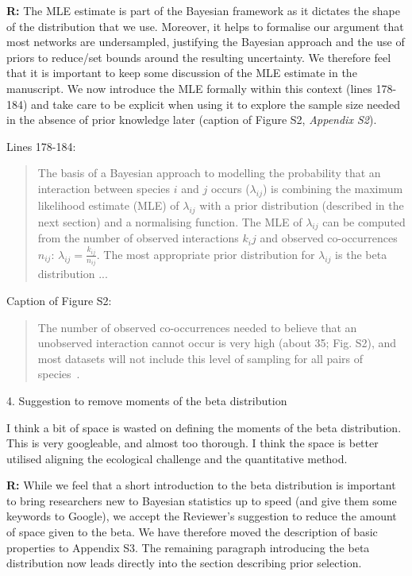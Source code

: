 \documentclass[12pt]{letter}
\newenvironment{refquote}{\bigskip \begin{it}}{\end{it}\smallskip}
\begin{document}
		\textbf{R:} The MLE estimate is part of the Bayesian framework as it dictates the shape of the distribution that we use. Moreover, it helps to formalise our argument that most networks are undersampled, justifying the Bayesian approach and the use of priors to reduce/set bounds around the resulting uncertainty. We therefore feel that it is important to keep some discussion of the MLE estimate in the manuscript. We now introduce the MLE formally within this context (lines 178-184) and take care to be explicit when using it to explore the sample size needed in the absence of prior knowledge later (caption of Figure S2, \emph{Appendix S2}).


		Lines 178-184:


		\begin{quotation}
			The basis of a Bayesian approach to modelling the probability that an interaction between species $i$ and $j$ occurs ($\lambda_{ij}$) is combining the maximum likelihood estimate (MLE) of $\lambda_{ij}$ with a prior distribution (described in the next section) and a normalising function. The MLE of $\lambda_{ij}$ can be computed from the number of observed interactions $k_ij$ and observed co-occurrences $n_{ij}$: $\lambda_{ij}=\frac{k_{ij}}{n_{ij}}$. The most appropriate prior distribution for $\lambda_{ij}$ is the beta distribution ...
		\end{quotation}


		Caption of Figure S2:


		\begin{quotation}
			The number of observed co-occurrences needed to believe that an unobserved interaction cannot occur is very high (about 35; Fig. S2), and most datasets will not include this level of sampling for all pairs of species~\citep{Bartomeus2013}.
		\end{quotation}


	4. Suggestion to remove moments of the beta distribution


		\begin{refquote}
		I think a bit of space is wasted on defining the moments of the beta distribution. This is very googleable, and almost too thorough. I think the space is better utilised aligning the ecological challenge and the quantitative method.
		\end{refquote}


		\textbf{R:} While we feel that a short introduction to the beta distribution is important to bring researchers new to Bayesian statistics up to speed (and give them some keywords to Google), we accept the Reviewer's suggestion to reduce the amount of space given to the beta. We have therefore moved the description of basic properties to Appendix S3. The remaining paragraph introducing the beta distribution now leads directly into the section describing prior selection.
\end{document}
